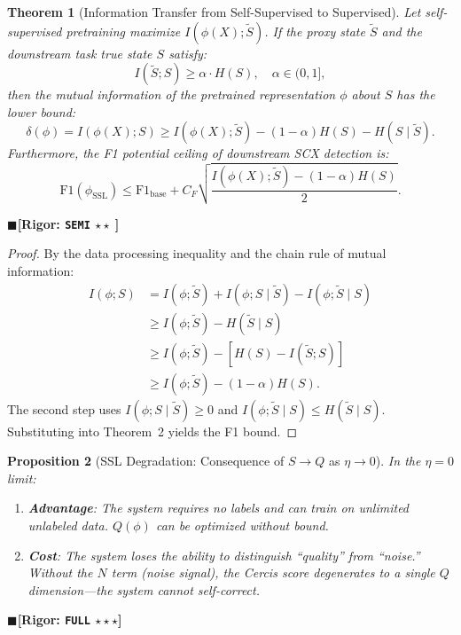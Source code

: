 \documentclass[12pt,a4paper]{article}
\newtheorem{theorem}{Theorem}[section]
\newtheorem{proposition}[theorem]{Proposition}
\theoremstyle{definition}
\theoremstyle{remark}
\newcommand{\rigorFull}{$\blacksquare$\;\textbf{[Rigor: \texttt{FULL} $\star\star\star$]}}
\newcommand{\rigorSemi}{$\blacksquare$\;\textbf{[Rigor: \texttt{SEMI} $\star\star\;$]}}
\begin{document}
\begin{theorem}[Information Transfer from Self-Supervised to Supervised]
\label{thm:7.1}
Let self-supervised pretraining maximize $I(\phi(X); \tilde{S})$. If the proxy state $\tilde{S}$ and the downstream task true state $S$ satisfy:
\begin{equation}
I(\tilde{S}; S) \geq \alpha \cdot H(S), \quad \alpha \in (0, 1],
\end{equation}
then the mutual information of the pretrained representation $\phi$ about $S$ has the lower bound:
\begin{equation}
\delta(\phi) = I(\phi(X); S) \geq I(\phi(X); \tilde{S}) - (1-\alpha)H(S) - H(S \mid \tilde{S}).
\end{equation}
Furthermore, the F1 potential ceiling of downstream SCX detection is:
\begin{equation}
\boxed{\mathrm{F1}(\phi_{\text{SSL}}) \leq \mathrm{F1}_{\text{base}} + C_F\sqrt{\frac{I(\phi(X); \tilde{S}) - (1-\alpha)H(S)}{2}}}.
\end{equation}
\end{theorem}
\rigorSemi

\begin{proof}
By the data processing inequality and the chain rule of mutual information:
\begin{align}
I(\phi; S) &= I(\phi; \tilde{S}) + I(\phi; S \mid \tilde{S}) - I(\phi; \tilde{S} \mid S) \\
           &\geq I(\phi; \tilde{S}) - H(\tilde{S} \mid S) \\
           &\geq I(\phi; \tilde{S}) - [H(S) - I(\tilde{S}; S)] \\
           &\geq I(\phi; \tilde{S}) - (1-\alpha)H(S).
\end{align}
The second step uses $I(\phi; S \mid \tilde{S}) \geq 0$ and $I(\phi; \tilde{S} \mid S) \leq H(\tilde{S} \mid S)$. Substituting into Theorem~2 yields the F1 bound.
\end{proof}

\begin{proposition}[SSL Degradation: Consequence of $S \to Q$ as $\eta \to 0$]
\label{prop:14}
In the $\eta = 0$ limit:
\begin{enumerate}[label=\arabic*.]
\item \textbf{Advantage}: The system requires no labels and can train on unlimited unlabeled data. $Q(\phi)$ can be optimized without bound.
\item \textbf{Cost}: The system loses the ability to distinguish ``quality'' from ``noise.'' Without the $N$ term (noise signal), the Cercis score degenerates to a single $Q$ dimension---the system cannot self-correct.
\end{enumerate}
\end{proposition}
\rigorFull
\end{document}
